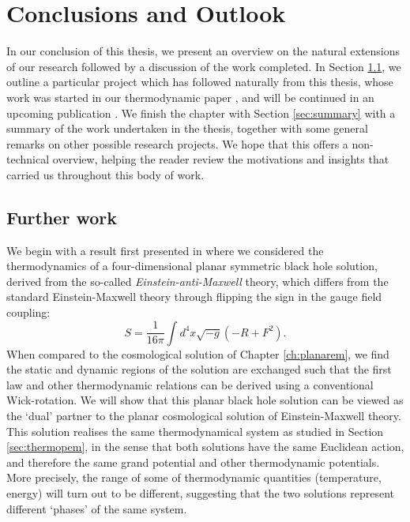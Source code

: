 \chapter{Conclusions and Outlook}
\label{ch:conclusion}

In our conclusion of this thesis, we present an overview on the natural extensions of our research followed by a discussion of the work completed. In Section \ref{sec:furtherwork}, we outline a particular project which has followed naturally from this thesis, whose work was started in our thermodynamic paper \cite{Gutowski:2020fzb}, and will be continued in an upcoming publication \cite{thirdpaper}. We finish the chapter with Section \ref{sec:summary} with a summary of the work undertaken in the thesis, together with some general remarks on other possible research projects. We hope that this offers a non-technical overview, helping the reader review the motivations and insights that carried us throughout this body of work.


\section{Further work}
\label{sec:furtherwork}

We begin with a result first presented in \cite{Gutowski:2020fzb} where we considered the thermodynamics of a four-dimensional planar symmetric black hole solution, derived from the so-called \emph{Einstein-anti-Maxwell} theory, which differs from the standard Einstein-Maxwell theory through flipping the sign in the gauge field coupling:
\begin{equation*}
	S = \frac{1}{16 \pi} \int d^4x \sqrt{-g} \left(-R + F^2 \right).
\end{equation*}
When compared to the cosmological solution of Chapter \ref{ch:planarem}, we find the static and dynamic regions of the solution are exchanged such that the first law and other thermodynamic relations can be derived using a conventional Wick-rotation. We will show that this planar black hole solution can be viewed as the `dual' partner to the planar cosmological solution of Einstein-Maxwell theory. This solution realises the same thermodynamical system as studied in Section \ref{sec:thermopem}, in the sense that both solutions have the same Euclidean action, and therefore the same grand potential and other thermodynamic potentials. More precisely, the range of some of thermodynamic quantities (temperature, energy) will turn out to be different, suggesting that the two solutions represent different `phases' of the same system.

